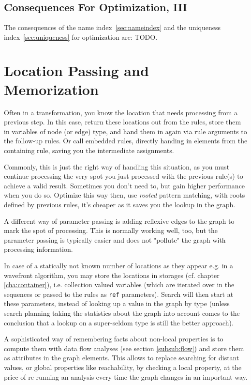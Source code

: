 \subsection{Consequences For Optimization, III}

The consequences of the name index~\ref{sec:nameindex} and the uniqueness index~\ref{sec:uniqueness} for optimization are: TODO.

\section{Location Passing and Memorization}
Often in a transformation, you know the location that needs processing from a previous step.
In this case, return these locations out from the rules, store them in variables of node (or edge) type, and hand them in again via rule arguments to the follow-up rules.
Or call embedded rules, directly handing in elements from the containing rule, saving you the intermediate assignments.

Commonly, this is just the right way of handling this situation, 
as you must continue processing the very spot you just processed with the previous rule(s) to achieve a valid result.
Sometimes you don't need to, but gain higher performance when you do so.
Optimize this way then, use \emph{rooted} pattern matching, with roots defined by previous rules, it's cheaper as it saves you the lookup in the graph.

A different way of parameter passing is adding reflexive edges to the graph to mark the spot of processing.
This is normally working well, too, but the parameter passing is typically easier and does not "pollute" the graph with processing information.

In case of a statically not known number of locations as they appear e.g. in a wavefront algorithm, you may store the locations in storages (cf. chapter \ref{cha:container}), i.e. collection valued variables (which are iterated over in the sequences or passed to the rules as \texttt{ref} parameters).
Search will then start at these parameters, instead of looking up a value in the graph by type (unless search planning taking the statistics about the graph into account comes to the conclusion that a lookup on a super-seldom type is still the better approach).

A sophisticated way of remembering facts about non-local properties is to compute them with data flow analyses (see section \ref{subsub:flow}) and store them as attributes in the graph elements.
This allows to replace searching for distant values, or global properties like reachability, by checking a local property, at the price of re-running an analysis every time the graph changes in an important way.

